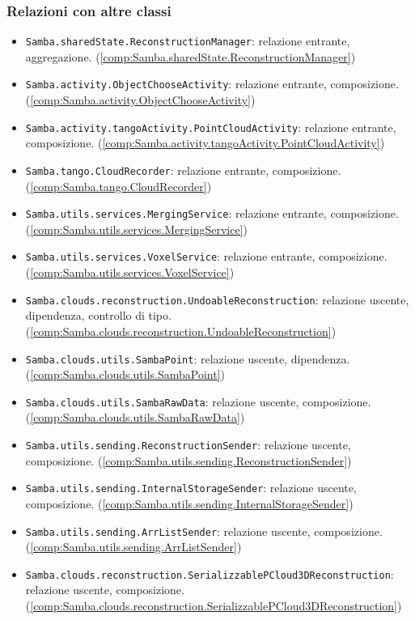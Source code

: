 \subsubsection{Relazioni con altre classi}
\begin{itemize}
	\item \texttt{Samba.sharedState.ReconstructionManager}: relazione entrante, aggregazione. (\ref{comp:Samba.sharedState.ReconstructionManager})
	\item \texttt{Samba.activity.ObjectChooseActivity}: relazione entrante, composizione. (\ref{comp:Samba.activity.ObjectChooseActivity})
	\item \texttt{Samba.activity.tangoActivity.PointCloudActivity}: relazione entrante, composizione. (\ref{comp:Samba.activity.tangoActivity.PointCloudActivity})
	\item \texttt{Samba.tango.CloudRecorder}: relazione entrante, composizione. (\ref{comp:Samba.tango.CloudRecorder})
	\item \texttt{Samba.utils.services.MergingService}: relazione entrante, composizione. (\ref{comp:Samba.utils.services.MergingService})
	\item \texttt{Samba.utils.services.VoxelService}: relazione entrante, composizione.	 (\ref{comp:Samba.utils.services.VoxelService})
	\item \texttt{Samba.clouds.reconstruction.UndoableReconstruction}: relazione uscente, dipendenza, controllo di tipo. (\ref{comp:Samba.clouds.reconstruction.UndoableReconstruction})
	\item \texttt{Samba.clouds.utils.SambaPoint}: relazione uscente, dipendenza. (\ref{comp:Samba.clouds.utils.SambaPoint})
	\item \texttt{Samba.clouds.utils.SambaRawData}: relazione uscente, composizione. (\ref{comp:Samba.clouds.utils.SambaRawData})
	\item \texttt{Samba.utils.sending.ReconstructionSender}: relazione uscente, composizione. (\ref{comp:Samba.utils.sending.ReconstructionSender})
	\item \texttt{Samba.utils.sending.InternalStorageSender}: relazione uscente, composizione. (\ref{comp:Samba.utils.sending.InternalStorageSender})
	\item \texttt{Samba.utils.sending.ArrListSender}: relazione uscente, composizione.	 (\ref{comp:Samba.utils.sending.ArrListSender})
	\item \texttt{Samba.clouds.reconstruction.SerializzablePCloud3DReconstruction}: relazione uscente, composizione. (\ref{comp:Samba.clouds.reconstruction.SerializzablePCloud3DReconstruction})
\end{itemize}

